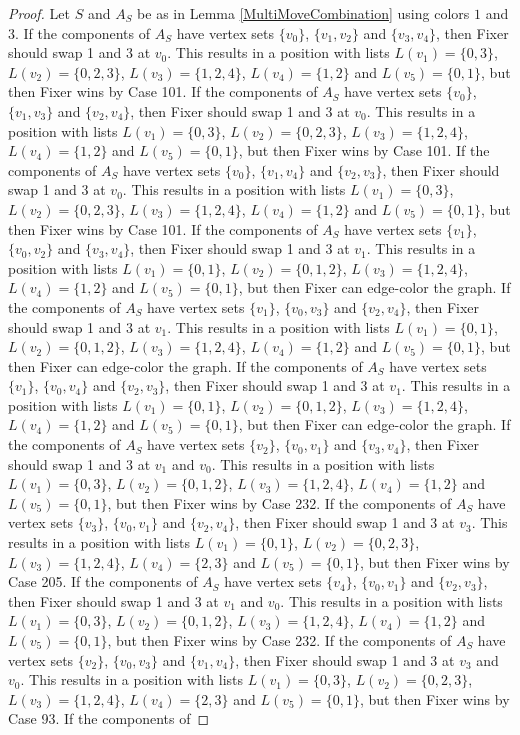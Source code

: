\documentclass[12pt]{amsart}
\theoremstyle{plain}
\theoremstyle{definition}
\theoremstyle{remark}
\begin{document}
\begin{proof}
Let $S$ and $A_S$ be as in Lemma \ref{MultiMoveCombination} using colors $1$ and $3$. If the components of $A_S$ have vertex sets $\{v_0\}$, $\{v_1, v_2\}$ and $\{v_3, v_4\}$, then Fixer should swap 1 and 3 at $v_0$. This results in a position with lists $L(v_1) = \{0, 3\}$, $L(v_2) = \{0, 2, 3\}$, $L(v_3) = \{1, 2, 4\}$, $L(v_4) = \{1, 2\}$ and $L(v_5) = \{0, 1\}$, but then Fixer wins by Case 101. If the components of $A_S$ have vertex sets $\{v_0\}$, $\{v_1, v_3\}$ and $\{v_2, v_4\}$, then Fixer should swap 1 and 3 at $v_0$. This results in a position with lists $L(v_1) = \{0, 3\}$, $L(v_2) = \{0, 2, 3\}$, $L(v_3) = \{1, 2, 4\}$, $L(v_4) = \{1, 2\}$ and $L(v_5) = \{0, 1\}$, but then Fixer wins by Case 101. If the components of $A_S$ have vertex sets $\{v_0\}$, $\{v_1, v_4\}$ and $\{v_2, v_3\}$, then Fixer should swap 1 and 3 at $v_0$. This results in a position with lists $L(v_1) = \{0, 3\}$, $L(v_2) = \{0, 2, 3\}$, $L(v_3) = \{1, 2, 4\}$, $L(v_4) = \{1, 2\}$ and $L(v_5) = \{0, 1\}$, but then Fixer wins by Case 101. If the components of $A_S$ have vertex sets $\{v_1\}$, $\{v_0, v_2\}$ and $\{v_3, v_4\}$, then Fixer should swap 1 and 3 at $v_1$. This results in a position with lists $L(v_1) = \{0, 1\}$, $L(v_2) = \{0, 1, 2\}$, $L(v_3) = \{1, 2, 4\}$, $L(v_4) = \{1, 2\}$ and $L(v_5) = \{0, 1\}$, but then Fixer can edge-color the graph. If the components of $A_S$ have vertex sets $\{v_1\}$, $\{v_0, v_3\}$ and $\{v_2, v_4\}$, then Fixer should swap 1 and 3 at $v_1$. This results in a position with lists $L(v_1) = \{0, 1\}$, $L(v_2) = \{0, 1, 2\}$, $L(v_3) = \{1, 2, 4\}$, $L(v_4) = \{1, 2\}$ and $L(v_5) = \{0, 1\}$, but then Fixer can edge-color the graph. If the components of $A_S$ have vertex sets $\{v_1\}$, $\{v_0, v_4\}$ and $\{v_2, v_3\}$, then Fixer should swap 1 and 3 at $v_1$. This results in a position with lists $L(v_1) = \{0, 1\}$, $L(v_2) = \{0, 1, 2\}$, $L(v_3) = \{1, 2, 4\}$, $L(v_4) = \{1, 2\}$ and $L(v_5) = \{0, 1\}$, but then Fixer can edge-color the graph. If the components of $A_S$ have vertex sets $\{v_2\}$, $\{v_0, v_1\}$ and $\{v_3, v_4\}$, then Fixer should swap 1 and 3 at $v_1$ and $v_0$. This results in a position with lists $L(v_1) = \{0, 3\}$, $L(v_2) = \{0, 1, 2\}$, $L(v_3) = \{1, 2, 4\}$, $L(v_4) = \{1, 2\}$ and $L(v_5) = \{0, 1\}$, but then Fixer wins by Case 232. If the components of $A_S$ have vertex sets $\{v_3\}$, $\{v_0, v_1\}$ and $\{v_2, v_4\}$, then Fixer should swap 1 and 3 at $v_3$. This results in a position with lists $L(v_1) = \{0, 1\}$, $L(v_2) = \{0, 2, 3\}$, $L(v_3) = \{1, 2, 4\}$, $L(v_4) = \{2, 3\}$ and $L(v_5) = \{0, 1\}$, but then Fixer wins by Case 205. If the components of $A_S$ have vertex sets $\{v_4\}$, $\{v_0, v_1\}$ and $\{v_2, v_3\}$, then Fixer should swap 1 and 3 at $v_1$ and $v_0$. This results in a position with lists $L(v_1) = \{0, 3\}$, $L(v_2) = \{0, 1, 2\}$, $L(v_3) = \{1, 2, 4\}$, $L(v_4) = \{1, 2\}$ and $L(v_5) = \{0, 1\}$, but then Fixer wins by Case 232. If the components of $A_S$ have vertex sets $\{v_2\}$, $\{v_0, v_3\}$ and $\{v_1, v_4\}$, then Fixer should swap 1 and 3 at $v_3$ and $v_0$. This results in a position with lists $L(v_1) = \{0, 3\}$, $L(v_2) = \{0, 2, 3\}$, $L(v_3) = \{1, 2, 4\}$, $L(v_4) = \{2, 3\}$ and $L(v_5) = \{0, 1\}$, but then Fixer wins by Case 93. If the components of 
\end{proof}
\end{document}
